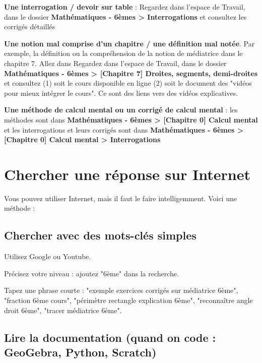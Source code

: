 \documentclass[answers]{exam}
\begin{document}
\begin{compactitem}
  \item \textbf{Une interrogation / devoir sur table} : Regardez dans l’espace de Travail, dans le dossier \textbf{Mathématiques - 6èmes > Interrogations} et consultez les corrigés détaillés 
  \item \textbf{Une notion mal comprise d'un chapitre / une définition mal notée}. Par exemple, la définition ou la compréhension de la notion de médiatrice dans le chapitre 7. Allez dans Regardez dans l’espace de Travail, 
    dans le dossier \textbf{Mathématiques - 6èmes > [Chapitre 7] Droites, segments, demi-droites} et consultez
    (1) soit le cours disponible en ligne (2) soit le document des "vidéos pour mieux intégrer le cours". Ce sont des liens vers des vidéos explicatives.
  \item \textbf{Une méthode de calcul mental ou un corrigé de calcul mental} : les méthodes sont dans \textbf{Mathématiques - 6èmes > [Chapitre 0] Calcul mental} et les interrogations et leurs corrigés sont dans \textbf{Mathématiques - 6èmes > [Chapitre 0] Calcul mental > Interrogations}
\end{compactitem}

\section{Chercher une réponse sur Internet}

Vous pouvez utiliser Internet, mais il faut le faire intelligemment. Voici une méthode :

\subsection{Chercher avec des mots-clés simples}

\begin{compactitem}
  \item Utilisez Google ou Youtube.
  \item Précisez votre niveau : ajoutez "6ème" dans la recherche.
  \item Tapez une phrase courte : "exemple exercices corrigés sur médiatrice 6ème", "fraction 6ème cours", "périmètre rectangle explication 6ème", "reconnaître angle droit 6ème", "tracer médiatrice 6ème".
\end{compactitem}

\subsection{Lire la documentation (quand on code : GeoGebra, Python, Scratch)}
\end{document}
